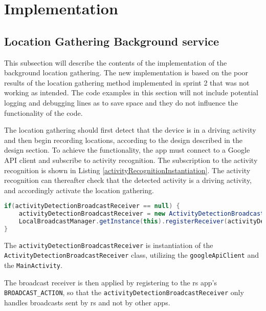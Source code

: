 \section{Implementation}

\subsection{Location Gathering Background service}
This subsection will describe the contents of the implementation of the background location gathering.
The new implementation is based on the poor results of the location gathering method implemented in sprint 2 that was not working as intended.
The code examples in this section will not include potential logging and debugging lines as to save space and they do not influence the functionality of the code.


The location gathering should first detect that the device is in a driving activity and then begin recording locations, according to the design described in the design section.
To achieve the functionality, the app must connect to a Google API client and subscribe to activity recognition.
The subscription to the activity recognition is shown in Listing \ref{activityRecognitionInstantiation}.
The activity recognition can thereafter check that the detected activity is a driving activity, and accordingly activate the location gathering.

\begin{lstlisting}[language=Java, label=activityRecognitionInstantiation, caption=Initialization of activity recognition.]
if(activityDetectionBroadcastReceiver == null) {
	activityDetectionBroadcastReceiver = new ActivityDetectionBroadcastReceiver(googleApiClient, this);
	LocalBroadcastManager.getInstance(this).registerReceiver(activityDetectionBroadcastReceiver, new IntentFilter("fapptory_inc.rideshare.BROADCAST_ACTION"));
}
\end{lstlisting}

The \texttt{activityDetectionBroadcastReceiver} is instantiation of the\\ \texttt{ActivityDetectionBroadcastReceiver} class, utilizing the \texttt{googleApiClient} and the \texttt{MainActivity}.

The broadcast receiver is then applied by registering to the \gls{rs} app's\\ \texttt{BROADCAST\_ACTION}, so that the \texttt{activityDetectionBroadcastReceiver} only handles broadcasts sent by \gls{rs} and not by other apps.

